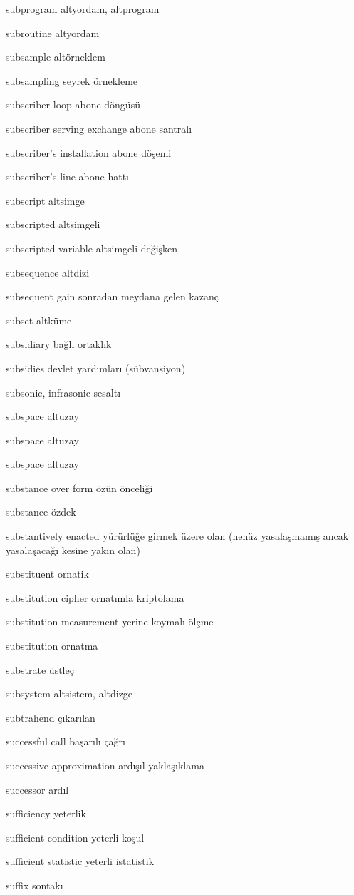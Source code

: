 \documentclass[12pt,fleqn]{article}\usepackage{../../common}
\begin{document}
subprogram altyordam, altprogram

subroutine altyordam

subsample altörneklem

subsampling seyrek örnekleme

subscriber loop abone döngüsü

subscriber serving exchange abone santralı

subscriber's installation abone döşemi

subscriber's line abone hattı

subscript altsimge

subscripted altsimgeli

subscripted variable altsimgeli değişken

subsequence altdizi

subsequent gain sonradan meydana gelen kazanç

subset altküme

subsidiary bağlı ortaklık

subsidies devlet yardımları (sübvansiyon)

subsonic, infrasonic sesaltı

subspace altuzay

subspace altuzay

subspace altuzay

substance over form özün önceliği

substance özdek

substantively enacted yürürlüğe girmek üzere olan (henüz yasalaşmamış ancak yasalaşacağı kesine yakın olan)

substituent ornatik

substitution cipher ornatımla kriptolama

substitution measurement yerine koymalı ölçme

substitution ornatma

substrate üstleç

subsystem altsistem, altdizge

subtrahend çıkarılan

successful call başarılı çağrı

successive approximation ardışıl yaklaşıklama

successor ardıl

sufficiency yeterlik

sufficient condition yeterli koşul

sufficient statistic yeterli istatistik

suffix sontakı
\end{document}

